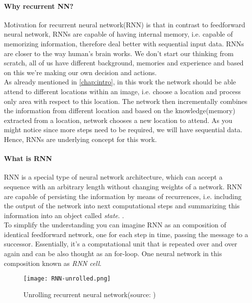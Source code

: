 \paragraph{Why recurrent NN?} Motivation for recurrent neural network(RNN) is that
in contrast to feedforward neural network, RNNs are capable of having internal memory,
i.e. capable of memorizing information, therefore deal better with sequential input data.
RNNs are closer to the way human's brain works. We don't start our thinking from scratch,
all of us have different background, memories and experience and based on this
we're making our own decision and actions. \\
As already mentioned in \autoref{chap:intro}, in this work
the network should be able attend to different locations within an image, i.e.
choose a location and process only area with respect to this location. The network then
incrementally combines the information from different location and based
on the knowledge(memory) extracted from a location, network chooses a new location to
attend. As you might notice since more steps need to be required, we will have sequential
data. Hence, RNNs are underlying concept for this work.

\paragraph{What is RNN} RNN is a special type of neural network architecture, which can
accept a sequence with an arbitrary length without changing weights of a network.
RNN are capable of persisting the information by means of recurrences, i.e. including
the output of the network into next computational steps and summarizing this information
into an object called \emph{state}.
 \cite{Kriesel2007NeuralNetworks}.
\\
To simplify the understanding you can imagine RNN as an composition of identical
feedforward network, one for each step in time, passing the message to a successor.
Essentially, it's a computational unit that is repeated over and over again and
can be also thought as an for-loop.
One neural network in this composition known as \emph{RNN cell}.

\begin{figure}[H]
	\texttt{[image: RNN-unrolled.png]}
	\caption{Unrolling recurrent neural network(source: \cite{ColahChristopher2015})}
	\label{img:rnn_unrolled}
\end{figure}

